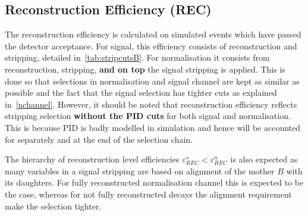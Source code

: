 
\subsection{Reconstruction Efficiency (REC)}
The reconstruction efficiency is calculated on simulated events which have passed the detector acceptance. For signal, this efficiency consists of reconstruction and stripping, detailed in~\autoref{tab:stripcutsB}. For normalisation it consists from reconstruction, stripping, \textbf{and on top} the signal stripping is applied. This is done so that selections in normalisation and signal channel are kept as similar as possible and the fact that the signal selection has tighter cuts as explained in~\autoref{nchannel}. However, it should be noted that reconstruction efficiency reflects stripping selection \textbf{without the PID cuts} for both signal and normalisation. This is because \gls{PID} is badly modelled in simulation and hence will be accounted for separately and at the end of the selection chain.

The hierarchy of reconstruction level efficiencies $\varepsilon^{s}_{REC} < \varepsilon^{n}_{REC}$ is also expected as many variables in a signal stripping are based on alignment of the mother $B$ with its daughters. For fully reconstructed normalisation channel this is expected to be the case, whereas for not fully reconstructed decays the alignment requirement make the selection tighter. 

